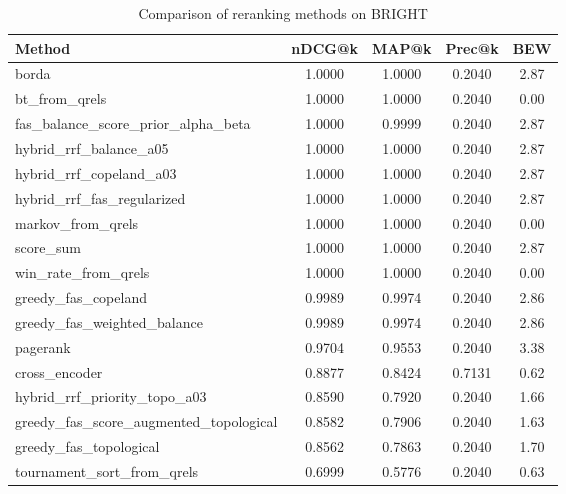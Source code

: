 \begin{table}[ht]
\centering
\caption{Comparison of reranking methods on BRIGHT}
\label{tab:modern_baselines_bright}
\begin{tabular}{lcccc}
\toprule
Method & nDCG@k & MAP@k & Prec@k & BEW \\
\midrule
borda & 1.0000 & 1.0000 & 0.2040 & 2.87 \\
bt\_from\_qrels & 1.0000 & 1.0000 & 0.2040 & 0.00 \\
fas\_balance\_score\_prior\_alpha\_beta & 1.0000 & 0.9999 & 0.2040 & 2.87 \\
hybrid\_rrf\_balance\_a05 & 1.0000 & 1.0000 & 0.2040 & 2.87 \\
hybrid\_rrf\_copeland\_a03 & 1.0000 & 1.0000 & 0.2040 & 2.87 \\
hybrid\_rrf\_fas\_regularized & 1.0000 & 1.0000 & 0.2040 & 2.87 \\
markov\_from\_qrels & 1.0000 & 1.0000 & 0.2040 & 0.00 \\
score\_sum & 1.0000 & 1.0000 & 0.2040 & 2.87 \\
win\_rate\_from\_qrels & 1.0000 & 1.0000 & 0.2040 & 0.00 \\
greedy\_fas\_copeland & 0.9989 & 0.9974 & 0.2040 & 2.86 \\
greedy\_fas\_weighted\_balance & 0.9989 & 0.9974 & 0.2040 & 2.86 \\
pagerank & 0.9704 & 0.9553 & 0.2040 & 3.38 \\
cross\_encoder & 0.8877 & 0.8424 & 0.7131 & 0.62 \\
hybrid\_rrf\_priority\_topo\_a03 & 0.8590 & 0.7920 & 0.2040 & 1.66 \\
greedy\_fas\_score\_augmented\_topological & 0.8582 & 0.7906 & 0.2040 & 1.63 \\
greedy\_fas\_topological & 0.8562 & 0.7863 & 0.2040 & 1.70 \\
tournament\_sort\_from\_qrels & 0.6999 & 0.5776 & 0.2040 & 0.63 \\
\bottomrule
\end{tabular}
\end{table}